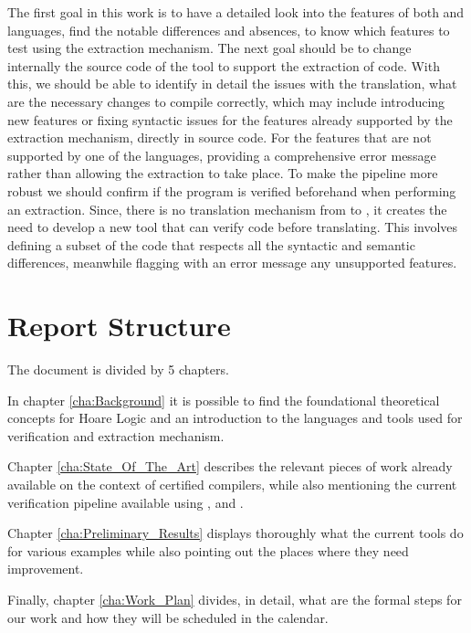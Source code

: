 The first goal in this work is to have a detailed look into the features of both \ocaml and \cml languages, find the notable 
differences and absences, to know which features to test using the extraction mechanism. The next goal should be to change 
internally the source code of the \cameleer tool to support the extraction of \cml code. With this, we should be able to identify
in detail the issues with the translation, what are the necessary changes to compile correctly, which may include introducing new features
or fixing syntactic issues for the features already supported by the extraction mechanism, directly in \whythree source code.
For the features that are not supported by one of the languages, providing a comprehensive error message rather than allowing 
the extraction to take place. To make the pipeline more robust we should confirm if the program is verified beforehand when performing 
an extraction. Since, there is no translation mechanism from \cml to \ocaml, it creates the need to develop a new tool that can
verify \cml code before translating. This involves defining a subset of the \cml code that respects all 
the syntactic and semantic differences, meanwhile flagging with an error message any unsupported features.

\section{Report Structure}
\label{sec:Report_Structure}

The document is divided by 5 chapters. 

In chapter \ref{cha:Background} it is possible to find the foundational theoretical concepts for Hoare Logic and an introduction to 
the languages and tools used for verification and extraction mechanism.

Chapter \ref{cha:State_Of_The_Art} describes the relevant pieces of work already available on the context of certified compilers, 
while also mentioning the current verification pipeline available using \cameleer, \whythree and \cml. 

Chapter \ref{cha:Preliminary_Results} displays thoroughly what the current tools do for various examples while also pointing out the 
places where they need improvement. 

Finally, chapter \ref{cha:Work_Plan} divides, in detail, what are the formal steps for our work and how they will be scheduled in 
the calendar.